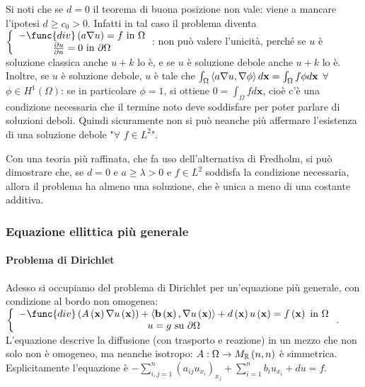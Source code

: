\documentclass{article}
\begin{document}
Si noti che se $d=0$ il teorema di buona posizione non vale: viene a mancare
l'ipotesi $d\geq c_{0}>0$. Infatti in tal caso il problema diventa $\left\{ 
\begin{array}{c}
-\func{div}\left( a\nabla u\right) =f\text{ in }\Omega \\ 
\frac{\partial u}{\partial n}=0\text{ in }\partial \Omega%
\end{array}%
\right. $: non pu\`{o} valere l'unicit\`{a}, perch\'{e} se $u$ \`{e}
soluzione classica anche $u+k$ lo \`{e}, e se $u$ \`{e} soluzione debole
anche $u+k$ lo \`{e}. Inoltre, se $u$ \`{e} soluzione debole, $u$ \`{e} tale
che $\int_{\Omega }\left\langle a\nabla u,\nabla \phi \right\rangle d\mathbf{%
x}=\int_{\Omega }f\phi d\mathbf{x}$ $\forall $ $\phi \in H^{1}\left( \Omega
\right) $: se in particolare $\phi =1$, si
ottiene $0=\int_{\Omega }fd\mathbf{x}$, cio\`{e} c'\`{e} una condizione
necessaria che il termine noto deve soddisfare per poter parlare di
soluzioni deboli. Quindi sicuramente non si pu\`{o} neanche pi\`{u}
affermare l'esistenza di una soluzione debole "$\forall $ $f\in L^{2}$".

Con una teoria pi\`{u} raffinata, che fa uso dell'alternativa di Fredholm,
si pu\`{o} dimostrare che, se $d=0$ e $a\geq \lambda >0$ e $f\in L^{2}$
soddisfa la condizione necessaria, allora il problema ha almeno una
soluzione, che \`{e} unica a meno di una costante additiva.

\subsubsection{Equazione ellittica pi\`{u} generale}

\paragraph{Problema di Dirichlet}

Adesso si occupiamo del problema di Dirichlet per un'equazione pi\`{u}
generale, con condizione al bordo non omogenea: $\left\{ 
\begin{array}{c}
-\func{div}\left( A\left( \mathbf{x}\right) \nabla u\left( \mathbf{x}\right)
\right) +\left\langle \mathbf{b}\left( \mathbf{x}\right) ,\nabla u\left( 
\mathbf{x}\right) \right\rangle +d\left( \mathbf{x}\right) u\left( \mathbf{x}%
\right) =f\left( \mathbf{x}\right) \text{ in }\Omega \\ 
u=g\text{ su }\partial \Omega%
\end{array}%
\right. $. L'equazione descrive la diffusione (con trasporto e reazione) in
un mezzo che non solo non \`{e} omogeneo, ma neanche isotropo: $A:\Omega
\rightarrow M_{%
\mathbb{R}
}\left( n,n\right) $ \`{e} simmetrica. Esplicitamente
l'equazione \`{e} $-\sum_{i,j=1}^{n}\left( a_{ij}u_{x_{i}}\right)
_{x_{j}}+\sum_{i=1}^{n}b_{i}u_{x_{i}}+du=f$.
\end{document}
